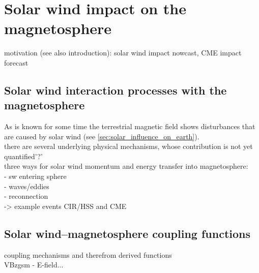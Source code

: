 \chapter{Solar wind impact on the magnetosphere}

motivation (see also introduction): solar wind impact nowcast, CME impact forecast\\


\section{Solar wind interaction processes with the magnetosphere}

As is known for some time the terrestrial magnetic field shows disturbances that are caused by solar wind (see \autoref{sec:solar_influence_on_earth}).\\

there are several underlying physical mechanisms, whose contribution is not yet quantified'?'\\

three ways for solar wind momentum and energy transfer into magnetosphere:\\
- sw entering sphere\\
- waves/eddies\\
- reconnection\\


-> example events CIR/HSS and CME\\


\section{Solar wind--magnetosphere coupling functions}
\label{sec:solar_wind_magnetosphere_coupling_functions}

coupling mechanisms and therefrom derived functions\\
VBzgsm - E-field...\\

